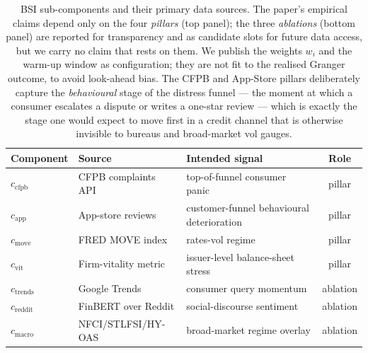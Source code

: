 \documentclass[11pt,letterpaper]{article}
\begin{document}
\begin{table}[H]
\centering
\small
\begin{tabular}{lllc}
\toprule
\textbf{Component} & \textbf{Source} & \textbf{Intended signal} & \textbf{Role} \\
\midrule
$c_{\text{cfpb}}$    & CFPB complaints API  & top-of-funnel consumer panic              & pillar \\
$c_{\text{app}}$     & App-store reviews    & customer-funnel behavioural deterioration & pillar \\
$c_{\text{move}}$    & FRED MOVE index      & rates-vol regime                          & pillar \\
$c_{\text{vit}}$     & Firm-vitality metric & issuer-level balance-sheet stress         & pillar \\
\midrule
$c_{\text{trends}}$  & Google Trends        & consumer query momentum                   & ablation \\
$c_{\text{reddit}}$  & FinBERT over Reddit  & social-discourse sentiment                & ablation \\
$c_{\text{macro}}$   & NFCI/STLFSI/HY-OAS   & broad-market regime overlay               & ablation \\
\bottomrule
\end{tabular}
\caption{BSI sub-components and their primary data sources. The
paper's empirical claims depend only on the four \emph{pillars}
(top panel); the three \emph{ablations} (bottom panel) are
reported for transparency and as candidate slots for future data
access, but we carry no claim that rests on them. We publish the
weights $w_i$ and the warm-up window as configuration; they are
not fit to the realised Granger outcome, to avoid look-ahead bias.
The CFPB and App-Store pillars deliberately capture the
\emph{behavioural} stage of the distress funnel --- the moment at
which a consumer escalates a dispute or writes a one-star
review --- which is exactly the stage one would expect to move
first in a credit channel that is otherwise invisible to bureaus
and broad-market vol gauges.}
\label{tab:bsi-components}
\end{table}
\end{document}

